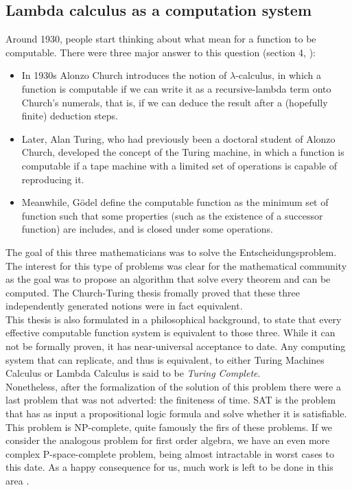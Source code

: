 \subsection{Lambda calculus as a computation system}
Around 1930, people start thinking about what mean for a function to be computable. There were three major answer to this question (section 4, \cite{cardone2006history}):
\begin{itemize}
\item In 1930s Alonzo Church introduces the notion of $\lambda$-calculus, in which a function is computable if we can write it as a recursive-lambda term onto Church's numerals, that is, if we can deduce the result after a (hopefully finite) deduction steps.
\item Later, Alan Turing, who had previously been a doctoral student of Alonzo Church, developed the concept of the Turing machine, in which a function is computable if a tape machine with a limited set of operations is capable of reproducing it.
\item Meanwhile, Gödel define the computable function as the minimum set of function such that some properties (such as the existence of a successor function) are includes, and is closed under some operations. 
\end{itemize}

The goal of this three mathematicians was to solve the Entscheidungsproblem\cite{hilbert1999principles}.\\

The interest for this type of problems was clear for the mathematical community as the goal was to propose an algorithm that solve every theorem and can be computed. The Church-Turing thesis fromally proved that these three independently generated notions were in fact equivalent\cite{copeland1997church}.\\


This thesis is also formulated in a philosophical background, to state that every effective computable function system is equivalent to those three. While it can not be formally proven, it has near-universal acceptance to date. Any computing system that can replicate, and thus is equivalent, to either Turing Machines Calculus or Lambda Calculus is said to be \emph{Turing Complete}.\\

Nonetheless, after the formalization of the solution of this problem there were a last problem that was not adverted: the finiteness of time. SAT is the problem that has as input a propositional logic formula and solve whether it is satisfiable. This problem is NP-complete, quite famously the firs of these problems\cite{cook1971complexity}. If we consider the analogous problem for first order algebra, we have an even more complex P-space-complete problem, being almost intractable in worst cases to this date. As a happy consequence for us, much work is left to be done in this area \cite{cook2006p}. 

